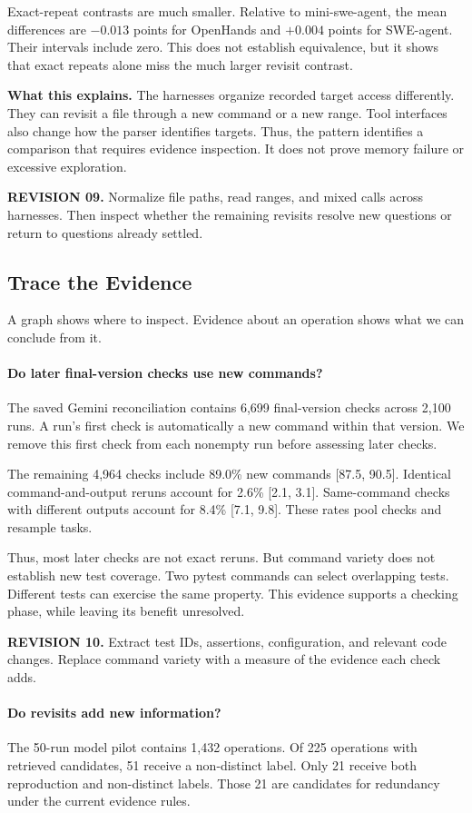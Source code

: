 \documentclass[10pt,a4paper,twocolumn]{article}
\newcommand{\rev}[2]{\par\smallskip\noindent\begin{minipage}{\linewidth}\color{revision}\footnotesize\textbf{REVISION #1.} #2\end{minipage}\par\smallskip}
\begin{document}
Exact-repeat contrasts are much smaller. Relative to mini-swe-agent, the mean differences are $-0.013$ points for OpenHands and $+0.004$ points for SWE-agent. Their intervals include zero. This does not establish equivalence, but it shows that exact repeats alone miss the much larger revisit contrast.

\textbf{What this explains.} The harnesses organize recorded target access differently. They can revisit a file through a new command or a new range. Tool interfaces also change how the parser identifies targets. Thus, the pattern identifies a comparison that requires evidence inspection. It does not prove memory failure or excessive exploration.
\rev{09}{Normalize file paths, read ranges, and mixed calls across harnesses. Then inspect whether the remaining revisits resolve new questions or return to questions already settled.}

\subsection{Trace the Evidence}
A graph shows where to inspect. Evidence about an operation shows what we can conclude from it.
\paragraph{Do later final-version checks use new commands?}
The saved Gemini reconciliation contains 6,699 final-version checks across 2,100 runs. A run's first check is automatically a new command within that version. We remove this first check from each nonempty run before assessing later checks.

The remaining 4,964 checks include 89.0\% new commands [87.5, 90.5]. Identical command-and-output reruns account for 2.6\% [2.1, 3.1]. Same-command checks with different outputs account for 8.4\% [7.1, 9.8]. These rates pool checks and resample tasks.

Thus, most later checks are not exact reruns. But command variety does not establish new test coverage. Two pytest commands can select overlapping tests. Different tests can exercise the same property. This evidence supports a checking phase, while leaving its benefit unresolved.
\rev{10}{Extract test IDs, assertions, configuration, and relevant code changes. Replace command variety with a measure of the evidence each check adds.}

\paragraph{Do revisits add new information?}
The 50-run model pilot contains 1,432 operations. Of 225 operations with retrieved candidates, 51 receive a non-distinct label. Only 21 receive both reproduction and non-distinct labels. Those 21 are candidates for redundancy under the current evidence rules.
\end{document}
